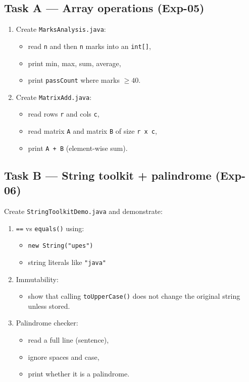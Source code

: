 \documentclass[11pt]{article}
\begin{document}
\subsection{Task A --- Array operations (Exp-05)}
\begin{enumerate}[leftmargin=*]
  \item Create \texttt{MarksAnalysis.java}:
  \begin{itemize}[leftmargin=*]
    \item read \texttt{n} and then \texttt{n} marks into an \texttt{int[]},
    \item print min, max, sum, average,
    \item print \texttt{passCount} where marks $\ge 40$.
  \end{itemize}

  \item Create \texttt{MatrixAdd.java}:
  \begin{itemize}[leftmargin=*]
    \item read rows \texttt{r} and cols \texttt{c},
    \item read matrix \texttt{A} and matrix \texttt{B} of size \texttt{r x c},
    \item print \texttt{A + B} (element-wise sum).
  \end{itemize}
\end{enumerate}

\subsection{Task B --- String toolkit + palindrome (Exp-06)}
Create \texttt{StringToolkitDemo.java} and demonstrate:
\begin{enumerate}[leftmargin=*]
  \item \texttt{==} vs \texttt{equals()} using:
  \begin{itemize}[leftmargin=*]
    \item \texttt{new String("upes")}
    \item string literals like \texttt{"java"}
  \end{itemize}

  \item Immutability:
  \begin{itemize}[leftmargin=*]
    \item show that calling \texttt{toUpperCase()} does not change the original string unless stored.
  \end{itemize}

  \item Palindrome checker:
  \begin{itemize}[leftmargin=*]
    \item read a full line (sentence),
    \item ignore spaces and case,
    \item print whether it is a palindrome.
  \end{itemize}
\end{enumerate}
\end{document}
